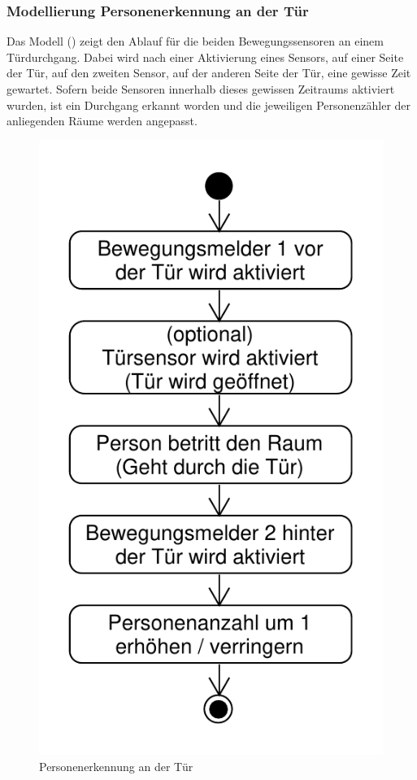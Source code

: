 \subsubsection{Modellierung Personenerkennung an der Tür}
\label{subsec:szenarioPersonTuer}
Das Modell () zeigt den Ablauf für die beiden Bewegungssensoren an einem Türdurchgang. Dabei wird nach einer Aktivierung eines Sensors, auf einer Seite der Tür, auf den zweiten Sensor, auf der anderen Seite der Tür, eine gewisse Zeit gewartet. Sofern beide Sensoren innerhalb dieses gewissen Zeitraums aktiviert wurden, ist ein Durchgang erkannt worden und die jeweiligen Personenzähler der anliegenden Räume werden angepasst.

\begin{figure}[h!]
	\centering
	\includegraphics[scale=0.7]{img/Szenarien/PersonenerkennungAnTuer.pdf}
	\caption{Personenerkennung an der Tür}
	\label{fig:szenarienPersonenerkennungTür}
\end{figure}

